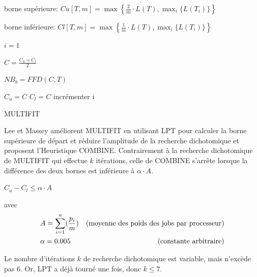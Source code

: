 \documentclass[a4paper,12pt]{report}
\theoremstyle{plain}				%
\theoremstyle{definition}				%
\begin{document}
\bigskip
\begin{algorithm}[H]
\DontPrintSemicolon
{}

\BlankLine %
borne supérieure: 
$Cu[T,m] = \max\left\{\frac{2}{m} \cdot L(T), \max_i\{L(T_i)\} \right\}$

borne inférieure: 
$Cl[T,m] = \max\left\{\frac{1}{m} \cdot L(T), \max_i\{L(T_i)\} \right\}$

\BlankLine %
$i=1$

 {
	$C = \frac{C_u + C_l}{2}$
	
	$NB_b = FFD(C, T)$ 
	
	 {
		$C_u = C$
	}
	\Sinon
	{
	 	$C_l = C$
	}
	incrémenter i
}
\BlankLine %


\caption{MULTIFIT}
\label{algo:MULTIFIT}
\end{algorithm}


\bigskip
Lee et Massey \cite{lee1988multiprocessor} améliorent MULTIFIT 
  en utilisant LPT pour 
  calculer la borne supérieure de départ et réduire l'amplitude de la recherche dichotomique 
  et proposent l'Heuristique COMBINE. 
Contrairement à la recherche dichotomique de MULTIFIT 
  qui effectue $k$ itérations, 
  celle de COMBINE s'arrête lorsque 
  la différence des deux bornes est inférieure à $\alpha \cdot A$.
  
$C_u - C_l \leq \alpha \cdot A$

avec  
\begin{align*}
&A = \sum_{i=1}^{n}(\frac{p_i}{m})	
&\textnormal{(moyenne des poids des jobs par processeur)} \\
&\alpha = 0.005 						
&\textnormal{(constante arbitraire)}
\end{align*}

Le nombre d’itérations $k$ de recherche dichotomique est variable, 
  mais n’excède pas 6. 
  Or, LPT a déjà tourné une fois, donc $k \leq 7$.
  
\end{document}

